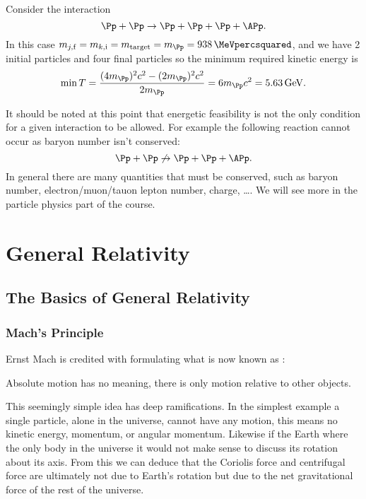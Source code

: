 \documentclass[fleqn]{NotesClass}
\begin{document}
    Consider the interaction
    \begin{equation}
        \Pp + \Pp \to \Pp + \Pp + \Pp + \APp.
    \end{equation}
    In this case \(m_{j,\mathrm{f}} = m_{k,\mathrm{i}} = m_{\mathrm{target}} = m_{\Pp} = \qty{938}{\MeVpercsquared}\), and we have 2 initial particles and four final particles so the minimum required kinetic energy is
    \begin{equation}
        \min T = \frac{(4m_{\Pp})^2c^2 - (2m_{\Pp})^2c^2}{2m_{\Pp}} = 6m_{\Pp}c^2 = \qty{5.63}{\giga\electronvolt}.
    \end{equation}
    
    It should be noted at this point that energetic feasibility is not the only condition for a given interaction to be allowed.
    For example the following reaction cannot occur as baryon number isn't conserved:
    \begin{equation}
        \Pp + \Pp \not\to \Pp + \Pp + \APp.
    \end{equation}
    In general there are many quantities that must be conserved, such as baryon number, electron/muon/tauon lepton number, charge, \dots.
    We will see more in the particle physics part of the course.
    
    \part{General Relativity}
    \chapter{The Basics of General Relativity}
    \section{Mach's Principle}
    Ernst Mach is credited with formulating what is now known as :
    \begin{important}
        Absolute motion has no meaning, there is only motion relative to other objects.
    \end{important}
    
    This seemingly simple idea has deep ramifications.
    In the simplest example a single particle, alone in the universe, cannot have any motion, this means no kinetic energy, momentum, or angular momentum.
    Likewise if the Earth where the only body in the universe it would not make sense to discuss its rotation about its axis.
    From this we can deduce that the Coriolis force and centrifugal force are ultimately not due to Earth's rotation but due to the net gravitational force of the rest of the universe.
    
\end{document}
